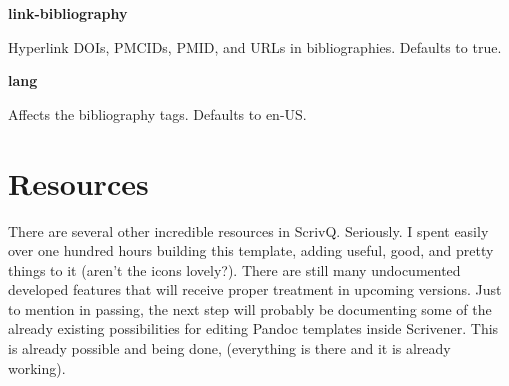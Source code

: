 \documentclass[
  12pt,
  a4paper,
  oneside,
  numbers=noenddot,
  titlepage,
  toclink=all,
  toc=bibliography]{scrbook}
\theoremstyle{definition}
\theoremstyle{definition}
\theoremstyle{definition}
\theoremstyle{plain}
\theoremstyle{plain}
\theoremstyle{plain}
\theoremstyle{plain}
\theoremstyle{plain}
\theoremstyle{remark}
\begin{document}
\begin{tcolorbox}[enhanced jigsaw, arc=.35mm, left=2mm, colframe=quarto-callout-tip-color-frame, bottomrule=.15mm, toprule=.15mm, colback=white, breakable, opacityback=0, rightrule=.15mm, leftrule=.75mm]
\begin{minipage}[t]{5.5mm}
\textcolor{quarto-callout-tip-color}{\faLightbulb}
\end{minipage}%
\begin{minipage}[t]{\textwidth - 5.5mm}

\textbf{link-bibliography}\vspace{2mm}

Hyperlink DOIs, PMCIDs, PMID, and URLs in bibliographies. Defaults to
true.

\end{minipage}%
\end{tcolorbox}

\begin{tcolorbox}[enhanced jigsaw, arc=.35mm, left=2mm, colframe=quarto-callout-tip-color-frame, bottomrule=.15mm, toprule=.15mm, colback=white, breakable, opacityback=0, rightrule=.15mm, leftrule=.75mm]
\begin{minipage}[t]{5.5mm}
\textcolor{quarto-callout-tip-color}{\faLightbulb}
\end{minipage}%
\begin{minipage}[t]{\textwidth - 5.5mm}

\textbf{lang}\vspace{2mm}

Affects the bibliography tags. Defaults to en-US.

\end{minipage}%
\end{tcolorbox}

\hypertarget{sec-scriv52}{%
\chapter{Resources}\label{sec-scriv52}}

There are several other incredible resources in ScrivQ. Seriously. I
spent easily over one hundred hours building this template, adding
useful, good, and pretty things to it (aren't the icons lovely?). There
are still many undocumented developed features that will receive proper
treatment in upcoming versions. Just to mention in passing, the next
step will probably be documenting some of the already existing
possibilities for editing Pandoc templates inside Scrivener. This is
already possible and being done, (everything is there and it is already
working).
\end{document}
